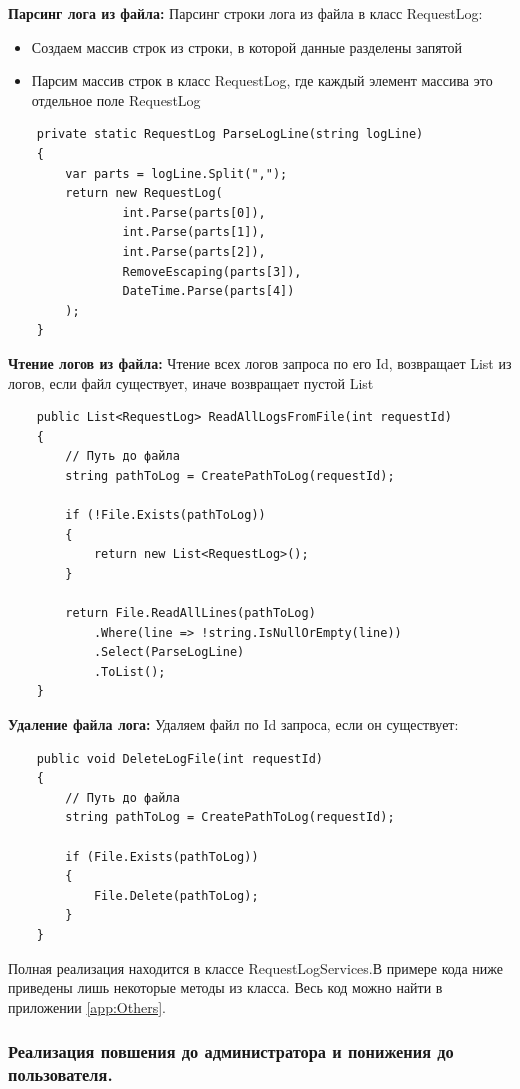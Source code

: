 \textbf{Парсинг лога из файла:} Парсинг строки лога из файла в класс RequestLog:
\begin{itemize}
	\item{Создаем массив строк из строки, в которой данные разделены запятой}
	\item{Парсим массив строк в класс RequestLog, где каждый элемент массива это отдельное поле RequestLog}
\end{itemize}
\begin{verbatim}
    private static RequestLog ParseLogLine(string logLine)
    {
        var parts = logLine.Split(",");
        return new RequestLog(
                int.Parse(parts[0]),
                int.Parse(parts[1]),
                int.Parse(parts[2]),
                RemoveEscaping(parts[3]),
                DateTime.Parse(parts[4])
        );
    }
\end{verbatim}

\textbf{Чтение логов из файла:} Чтение всех логов запроса по его Id, возвращает List из логов, если файл существует, иначе возвращает пустой List
\begin{verbatim}
    public List<RequestLog> ReadAllLogsFromFile(int requestId)
    {
        // Путь до файла
        string pathToLog = CreatePathToLog(requestId);

        if (!File.Exists(pathToLog))
        {
            return new List<RequestLog>();
        }

        return File.ReadAllLines(pathToLog)
            .Where(line => !string.IsNullOrEmpty(line))
            .Select(ParseLogLine)
            .ToList();
    }
\end{verbatim}

\textbf{Удаление файла лога:} Удаляем файл по Id запроса, если он существует:
\begin{verbatim}
    public void DeleteLogFile(int requestId)
    {
        // Путь до файла
        string pathToLog = CreatePathToLog(requestId);

        if (File.Exists(pathToLog))
        {
            File.Delete(pathToLog);
        }
    }
\end{verbatim}

Полная реализация находится в классе RequestLogServices.В примере кода ниже приведены лишь некоторые методы из класса. Весь код можно найти в приложении \ref{app:Others}.

\subsubsection{Реализация повшения до администратора и понижения до пользователя.}

